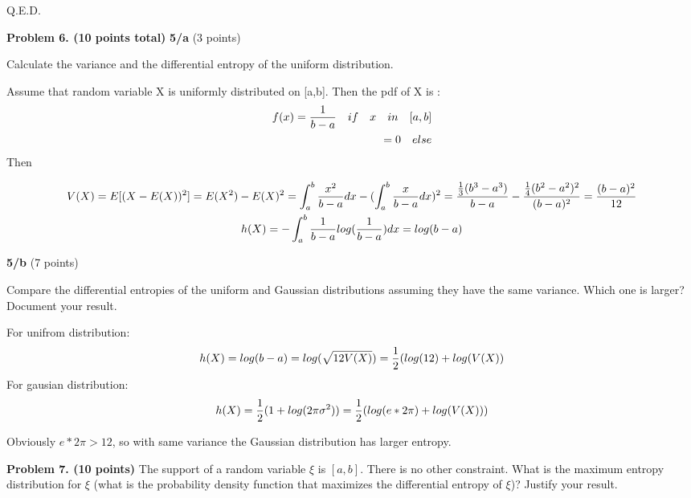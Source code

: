 \documentclass[epsfig]{article}
\def\bpar{\vskip26pt}
\def\spar{\vskip10pt}
\begin{document}
Q.E.D.\spar
\centerline{\underline{\makebox[15cm][c]{}}}
\bpar
{\bf Problem 6. (10 points total)}
\spar
{\bf 5/a} (3 points)

Calculate the variance and the differential entropy of the uniform distribution.
\spar
\centerline{\underline{}}
Assume that random variable X is uniformly distributed on [a,b].
Then the pdf of X is :
\begin{align*}
f(x)={1\over b-a} \quad if \quad x \quad in \quad [a,b]\\
=0 \quad else
\end{align*}
Then

\begin{gather}
V(X)=E[(X-E(X))^2]=E(X^2)-E(X)^2=\int_{a}^b {x^2\over b-a}dx-(\int_{a}^b{x\over b-a}dx)^2={{1\over 3}(b^3-a^3)\over b-a}-{{1\over 4 }(b^2-a^2)^2\over (b-a)^2}={(b-a)^2\over 12}\\
h(X)=-\int_{a}^b {1\over b-a}log({1\over b-a})dx=log(b-a)
\end{gather}

\spar
\centerline{\underline{\makebox[15cm][c]{}}}
\bpar
{\bf 5/b} (7 points)

Compare the differential entropies of the uniform and Gaussian distributions assuming they have the same variance. Which one is larger? Document your result.
\spar
\centerline{\underline{}}
\spar
For unifrom distribution:
\begin{gather}
h(X)=log(b-a)=log(\sqrt{12V(X)})={1\over 2}(log(12)+log(V(X))
\end{gather}
For gausian distribution:
\begin{gather}
h(X)={1\over 2}(1+log(2\pi\sigma^2))={1\over 2}(log(e*2\pi)+log( V(X)))
\end{gather}

Obviously $e*2\pi>12$, so with same variance the Gaussian distribution has larger entropy.
\spar
\centerline{\underline{\makebox[15cm][c]{}}}


\bpar
{\bf Problem 7. (10 points)}
\spar
The support of a random variable $\xi$ is $[a,b]$. There is no other constraint. What is the maximum entropy distribution for $\xi$ (what is the probability density function that maximizes the differential entropy of $\xi$)?
Justify your result.
\end{document}
